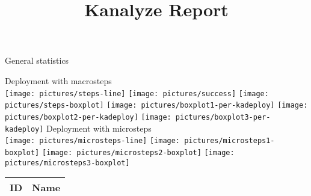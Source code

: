 \documentclass[12pt]{article}
\title{Kanalyze Report}
\date{\currenttime}
\begin{document}
\maketitle
{\LARGE General statistics}
\newline

\newline
{\LARGE Deployment with macrosteps}\\
\texttt{[image: pictures/steps-line]}
\texttt{[image: pictures/success]}
\texttt{[image: pictures/steps-boxplot]}
\texttt{[image: pictures/boxplot1-per-kadeploy]}
\texttt{[image: pictures/boxplot2-per-kadeploy]}
\texttt{[image: pictures/boxplot3-per-kadeploy]}
\newpage
{\LARGE Deployment with microsteps}\\
\texttt{[image: pictures/microsteps-line]}
\texttt{[image: pictures/microsteps1-boxplot]}
\texttt{[image: pictures/microsteps2-boxplot]}
\texttt{[image: pictures/microsteps3-boxplot]}
\newline
\begin{table}
\small
\begin{tabular}{|l|l|}
\hline
ID & Name \\
\hline

\hline
\end{tabular}
\end{table}
\end{document}
